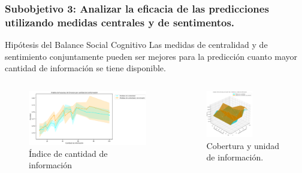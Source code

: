 \documentclass{beamer}
\begin{document}
\begin{frame}
	\frametitle{Subobjetivo 3: Analizar la eficacia de las predicciones utilizando medidas centrales y de sentimentos.}
\begin{block}{Hipótesis del Balance Social Cognitivo}
	Las medidas de centralidad y de sentimiento conjuntamente pueden ser mejores para la predicción cuanto mayor cantidad de información se tiene disponible.
\end{block}
	
	
	\begin{columns}[c]
		\begin{column}{.5\textwidth}
			\begin{figure}
				\centering
				\includegraphics[width=1\textwidth]{figs/cap7/figura_55}
\caption{Índice de cantidad de información}
			\end{figure}      
		\end{column}
		\begin{column}{.5\textwidth}
			\begin{figure}
				\centering
				\includegraphics[width=0.60\textwidth]{figs/cap7/figura_56}
			\caption{Cobertura y unidad de información.}
			\end{figure}
		\end{column}
	\end{columns}
	
	
	
\end{frame}
\end{document}
